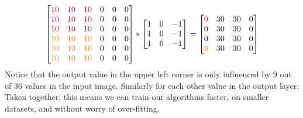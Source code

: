 \documentclass[12pt]{article}
\begin{document}
\begin{equation*}   \begin{bmatrix}
 \color{purple} 10 & \color{purple} 10 & \color{purple} 10 & 0 & 0 & 0 \\
 \color{purple} 10 & \color{purple} 10 & \color{purple} 10 & 0 & 0 & 0 \\
 \color{purple} 10 & \color{purple} 10 & \color{purple} 10 & 0 & 0 & 0 \\
 \color{orange} 10 & \color{orange} 10 & \color{orange} 10 & 0 & 0 & 0 \\
 \color{orange} 10 & \color{orange} 10 & \color{orange} 10 & 0 & 0 & 0 \\
 \color{orange} 10 & \color{orange} 10 & \color{orange} 10 & 0 & 0 & 0
  \end{bmatrix} 
  * 
  \begin{bmatrix}     
    1 & 0 & -1 \\     
    1 & 0 & -1 \\
    1 & 0 & -1 \\
  \end{bmatrix}
  =
  \begin{bmatrix}     
    \color{purple} 0 & 30 & 30 & 0 \\
    0 & 30 & 30 & 0 \\
    0 & 30 & 30 & 0 \\
    \color{orange} 0 & 30 & 30 & 0 \\
  \end{bmatrix} 
\end{equation*}
 Notice that the output value in the upper left corner is only influenced by 9 out of 36 values in the input image. Similarly for
each other value in the output layer.
Taken together, this means we can train our algorithms faster, on smaller datasets, and without worry of over-fitting.
\end{document}
